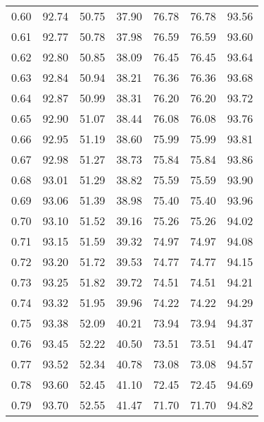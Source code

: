 \begin{tabular}{|c|c|c|c|c|c|c|}
      0.60 &     92.74 &     50.75 &      37.90 &   76.78 &      76.78 &         93.56 \\
      0.61 &     92.77 &     50.78 &      37.98 &   76.59 &      76.59 &         93.60 \\
      0.62 &     92.80 &     50.85 &      38.09 &   76.45 &      76.45 &         93.64 \\
      0.63 &     92.84 &     50.94 &      38.21 &   76.36 &      76.36 &         93.68 \\
      0.64 &     92.87 &     50.99 &      38.31 &   76.20 &      76.20 &         93.72 \\
      0.65 &     92.90 &     51.07 &      38.44 &   76.08 &      76.08 &         93.76 \\
      0.66 &     92.95 &     51.19 &      38.60 &   75.99 &      75.99 &         93.81 \\
      0.67 &     92.98 &     51.27 &      38.73 &   75.84 &      75.84 &         93.86 \\
      0.68 &     93.01 &     51.29 &      38.82 &   75.59 &      75.59 &         93.90 \\
      0.69 &     93.06 &     51.39 &      38.98 &   75.40 &      75.40 &         93.96 \\
      0.70 &     93.10 &     51.52 &      39.16 &   75.26 &      75.26 &         94.02 \\
      0.71 &     93.15 &     51.59 &      39.32 &   74.97 &      74.97 &         94.08 \\
      0.72 &     93.20 &     51.72 &      39.53 &   74.77 &      74.77 &         94.15 \\
      0.73 &     93.25 &     51.82 &      39.72 &   74.51 &      74.51 &         94.21 \\
      0.74 &     93.32 &     51.95 &      39.96 &   74.22 &      74.22 &         94.29 \\
      0.75 &     93.38 &     52.09 &      40.21 &   73.94 &      73.94 &         94.37 \\
      0.76 &     93.45 &     52.22 &      40.50 &   73.51 &      73.51 &         94.47 \\
      0.77 &     93.52 &     52.34 &      40.78 &   73.08 &      73.08 &         94.57 \\
      0.78 &     93.60 &     52.45 &      41.10 &   72.45 &      72.45 &         94.69 \\
      0.79 &     93.70 &     52.55 &      41.47 &   71.70 &      71.70 &         94.82 \\

\end{tabular}
